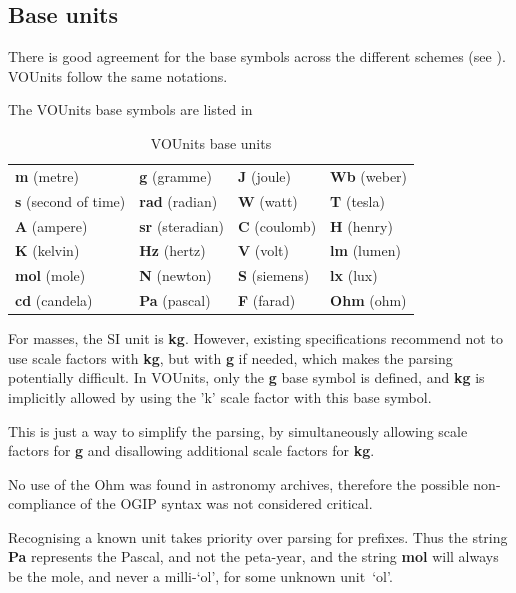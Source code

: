\documentclass[11pt,notitlepage,onecolumn]{ivoa}
\newcommand{\unit}[1]{\textbf{\textsf{\color{orange}#1}}}
\begin{document}
\subsection{Base units\label{sec:baseUnits}}

There is good agreement for the base symbols across the different schemes
(see ).  VOUnits follow the same notations.

The VOUnits base symbols are listed in 

\begin{table}[ht]
\begin{center}
\begin{tabular}{|l|l|l|l|}\hline
\unit{m} (metre)		&\unit{g} (gramme) 	&\unit{J} (joule)     	&\unit{Wb} (weber)\\
\unit{s} (second of time)	&\unit{rad} (radian)    &\unit{W} (watt) 	&\unit{T} (tesla)\\
\unit{A} (ampere)		&\unit{sr} (steradian)  &\unit{C} (coulomb)	&\unit{H} (henry)\\
\unit{K} (kelvin)		&\unit{Hz} (hertz)      &\unit{V} (volt) 	&\unit{lm} (lumen)\\
\unit{mol} (mole)		&\unit{N} (newton)      &\unit{S} (siemens)	&\unit{lx} (lux)\\
\unit{cd} (candela)		&\unit{Pa} (pascal)     &\unit{F} (farad)	&\unit{Ohm} (ohm)\\\hline
\end{tabular}
\end{center}
\caption{\label{tab:voubase}VOUnits base units}
\end{table}

For masses, the SI unit is \unit{kg}. However, existing specifications recommend not to use scale factors with
\unit{kg}, but with \unit{g} if needed, which makes the parsing potentially difficult. In VOUnits, only the 
\unit{g} base symbol is defined, and \unit{kg} is implicitly allowed by using the 'k' scale factor with this
base symbol. 

This is just a way to simplify the parsing, by simultaneously allowing scale factors for \unit{g} and
disallowing additional scale factors for \unit{kg}.

No use of the Ohm was found in astronomy archives, therefore the possible non-compliance of the OGIP
syntax was not considered critical.

Recognising a known unit takes priority over parsing for prefixes.
Thus the string \unit{Pa} represents the Pascal, and not the
peta-year, and the string \unit{mol} will always be the mole, and
never a milli-`ol', for some unknown unit~`ol'.
\end{document}

